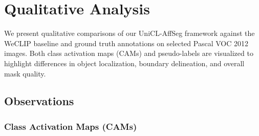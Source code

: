 \section{Qualitative Analysis}
\label{sec:qualitative_analysis}

We present qualitative comparisons of our UniCL-AffSeg framework against the WeCLIP baseline and ground truth annotations on selected Pascal VOC 2012 images. Both class activation maps (CAMs) and pseudo-labels are visualized to highlight differences in object localization, boundary delineation, and overall mask quality.


\subsection{Observations}

\subsubsection{Class Activation Maps (CAMs)}




